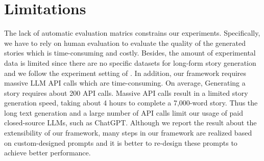 \section*{Limitations} 
The lack of automatic evaluation matrics constrains our experiments. Specifically, we have to rely on human evaluation to evaluate the quality of the generated stories which is time-consuming and costly. Besides, the amount of experimental data is limited since there are no specific datasets for long-form story generation and we follow the experiment setting of \cite{DOC}. In addition, our framework requires massive LLM API calls which are time-consuming. On average, Generating a story requires about 200 API calls. Massive API calls result in a limited story generation speed, taking about 4 hours to complete a 7,000-word story. Thus the long text generation and a large number of API calls limit our usage of paid closed-source LLMs, such as ChatGPT.
Although we report the result about the extensibility of our framework, many steps in our framework are realized based on custom-designed prompts and it is better to re-design these prompts to achieve better performance.


